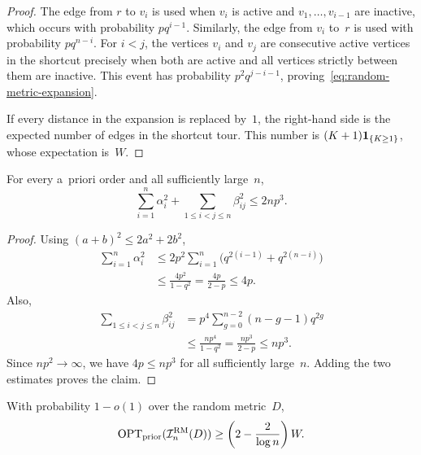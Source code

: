 \documentclass[12pt,a4paper,oneside]{report}
\begin{document}
\begin{proof}
The edge from $r$ to $v_i$ is used when $v_i$ is active and
$v_1,\ldots,v_{i-1}$ are inactive, which occurs with probability $pq^{i-1}$.
Similarly, the edge from $v_i$ to~$r$ is used with probability
$pq^{n-i}$.  For $i<j$, the vertices $v_i$ and $v_j$ are consecutive
active vertices in the shortcut precisely when both are active and all vertices
strictly between them are inactive.  This event has probability
$p^2q^{j-i-1}$, proving~\cref{eq:random-metric-expansion}.

If every distance in the expansion is replaced by~$1$, the right-hand side
is the expected number of edges in the shortcut tour.  This number is
$(K+1)\mathbf{1}_{\{K\ge1\}}$, whose expectation is~$W$.
\end{proof}

\begin{lemma}
\label{lem:random-metric-coefficients}
For every a~priori order and all sufficiently large~$n$,
\[
    \sum_{i=1}^n\alpha_i^2
    +
    \sum_{1\le i<j\le n}\beta_{ij}^2
    \le 2np^3.
\]
\end{lemma}

\begin{proof}
Using $(a+b)^2\le2a^2+2b^2$,
\begin{align*}
    \sum_{i=1}^n\alpha_i^2
    &\le
    2p^2\sum_{i=1}^n
        \bigl(q^{2(i-1)}+q^{2(n-i)}\bigr)\\
    &\le
    \frac{4p^2}{1-q^2}
    =
    \frac{4p}{2-p}
    \le4p.
\end{align*}
Also,
\begin{align*}
    \sum_{1\le i<j\le n}\beta_{ij}^2
    &=
    p^4\sum_{g=0}^{n-2}(n-g-1)q^{2g}\\
    &\le
    \frac{np^4}{1-q^2}
    =
    \frac{np^3}{2-p}
    \le np^3.
\end{align*}
Since $np^2\to\infty$, we have $4p\le np^3$ for all sufficiently
large~$n$.  Adding the two estimates proves the claim.
\end{proof}

\begin{lemma}
\label{lem:random-metric-prior}
With probability $1-o(1)$ over the random metric~$D$,
\[
    \operatorname{OPT}_\mathrm{prior}(\mathcal{I}_n^{\mathrm{RM}}(D))
    \ge
    \left(2-\frac{2}{\log n}\right)W.
\]
\end{lemma}
\end{document}
